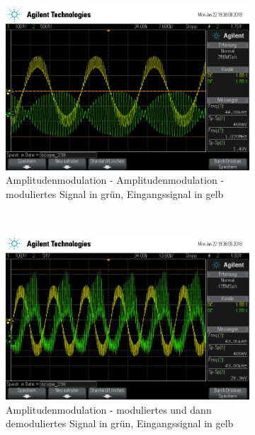 \begin{figure}[t!]
	\centering
	\begin{subfigure}[t]{0.5\textwidth}
		\centering
		\includegraphics[width=\textwidth]{img/h_scope_239.png}
		\caption{Amplitudenmodulation - Amplitudenmodulation - moduliertes  Signal in grün, Eingangssignal in gelb}
	\end{subfigure}%
	~
	\begin{subfigure}[t]{0.5\textwidth}
		\centering
		\includegraphics[width=\textwidth]{img/h_scope_238.png}
		\caption{Amplitudenmodulation - moduliertes und dann demoduliertes Signal in grün, Eingangssignal in gelb}
	\end{subfigure}
	\\
	\begin{subfigure}[t]{0.5\textwidth}
		\centering

\end{subfigure}
\end{figure}
